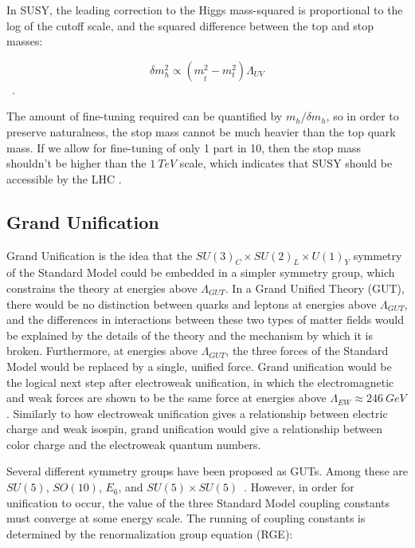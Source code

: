 In SUSY, the leading correction to the Higgs mass-squared is proportional to the log of the cutoff scale,
and the squared difference between the top and stop masses:

\begin{equation}\label{eq:susy_higgs_correction}
    \delta m_h^2 \propto \left(m_{\tilde{t}}^2 - m_t^2\right)  \Lambda_{UV}
\end{equation}~\cite{susy-pheno-2000}.

The amount of fine-tuning required can be quantified by $m_h / \delta m_h $, so in order to preserve naturalness,
the stop mass cannot be much heavier than the top quark mass.
If we allow for fine-tuning of only 1 part in 10, then the stop mass shouldn't be higher than the $1~TeV$ scale,
which indicates that SUSY should be accessible by the LHC .

\subsection{Grand Unification}\label{subsec:susy_unification}

Grand Unification is the idea that the $SU(3)_C \times SU(2)_L \times U(1)_Y$ symmetry of the Standard Model
could be embedded in a simpler symmetry group, which constrains the theory at energies above $\Lambda_{GUT}$.
In a Grand Unified Theory (GUT), there would be no distinction between quarks and leptons at energies above $\Lambda_{GUT}$,
and the differences in interactions between these two types of matter fields would be explained by the details of the
theory and the mechanism by which it is broken.
Furthermore, at energies above $\Lambda_{GUT}$, the three forces of the Standard Model would be replaced by a single, unified force.
Grand unification would be the logical next step after electroweak unification,
in which the electromagnetic and weak forces are shown to be the same force at energies above $\Lambda_{EW}\approx 246~GeV$.
Similarly to how electroweak unification gives a relationship between electric charge and weak isospin,
grand unification would give a relationship between color charge and the electroweak quantum numbers.

Several different symmetry groups have been proposed as GUTs.
Among these are $SU(5)$, $SO(10)$, $E_6$, and $SU(5)\times SU(5)$~\cite{susy-unification-1998}.
However, in order for unification to occur, the value of the three Standard Model coupling constants must converge at some energy scale.
The running of coupling constants is determined by the renormalization group equation (RGE):


